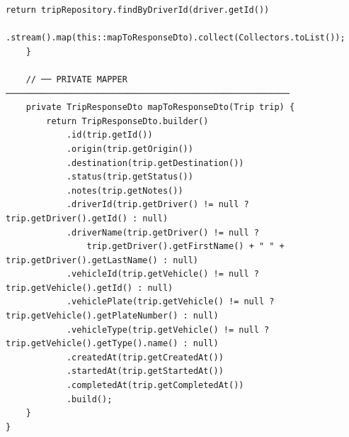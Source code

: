 \documentclass[12pt,a4paper]{report}
\begin{document}
\begin{lstlisting}[caption=TripService.java -- Full Business Logic]
        return tripRepository.findByDriverId(driver.getId())
            .stream().map(this::mapToResponseDto).collect(Collectors.toList());
    }

    // ── PRIVATE MAPPER ────────────────────────────────────────────────────────
    private TripResponseDto mapToResponseDto(Trip trip) {
        return TripResponseDto.builder()
            .id(trip.getId())
            .origin(trip.getOrigin())
            .destination(trip.getDestination())
            .status(trip.getStatus())
            .notes(trip.getNotes())
            .driverId(trip.getDriver() != null ? trip.getDriver().getId() : null)
            .driverName(trip.getDriver() != null ?
                trip.getDriver().getFirstName() + " " + trip.getDriver().getLastName() : null)
            .vehicleId(trip.getVehicle() != null ? trip.getVehicle().getId() : null)
            .vehiclePlate(trip.getVehicle() != null ? trip.getVehicle().getPlateNumber() : null)
            .vehicleType(trip.getVehicle() != null ? trip.getVehicle().getType().name() : null)
            .createdAt(trip.getCreatedAt())
            .startedAt(trip.getStartedAt())
            .completedAt(trip.getCompletedAt())
            .build();
    }
}
\end{lstlisting}
\end{document}
